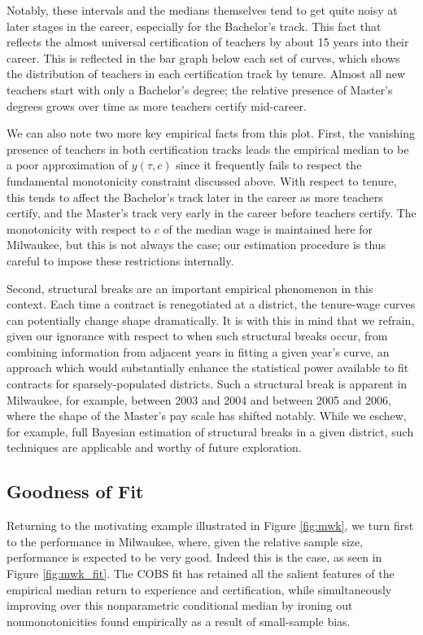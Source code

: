 Notably, these intervals and the medians themselves tend to get quite
noisy at later stages in the career, especially for the Bachelor's
track. This fact that reflects the almost universal certification of
teachers by about 15 years into their career. This is reflected in the
bar graph below each set of curves, which shows the distribution of
teachers in each certification track by tenure. Almost all new teachers
start with only a Bachelor's degree; the relative presence of Master's
degrees grows over time as more teachers certify mid-career.

We can also note two more key empirical facts from this plot. First, the
vanishing presence of teachers in both certification tracks leads the
empirical median to be a poor approximation of \(y(\tau, c)\) since it
frequently fails to respect the fundamental monotonicity constraint
discussed above. With respect to tenure, this tends to affect the
Bachelor's track later in the career as more teachers certify, and the
Master's track very early in the career before teachers certify. The
monotonicity with respect to \(c\) of the median wage is maintained here
for Milwaukee, but this is not always the case; our estimation procedure
is thus careful to impose these restrictions internally.

Second, structural breaks are an important empirical phenomenon in this
context. Each time a contract is renegotiated at a district, the
tenure-wage curves can potentially change shape dramatically. It is with
this in mind that we refrain, given our ignorance with respect to when
such structural breaks occur, from combining information from adjacent
years in fitting a given year's curve, an approach which would
substantially enhance the statistical power available to fit contracts
for sparsely-populated districts. Such a structural break is apparent in
Milwaukee, for example, between 2003 and 2004 and between 2005 and 2006,
where the shape of the Master's pay scale has shifted notably. While we
eschew, for example, full Bayesian estimation of structural breaks in a
given district, such techniques are applicable and worthy of future
exploration.

\subsection{Goodness of Fit}\label{goodness-of-fit}

Returning to the motivating example illustrated in Figure \ref{fig:mwk},
we turn first to the performance in Milwaukee, where, given the relative
sample size, performance is expected to be very good. Indeed this is the
case, as seen in Figure \ref{fig:mwk_fit}. The COBS fit has retained all
the salient features of the empirical median return to experience and
certification, while simultaneously improving over this nonparametric
conditional median by ironing out nonmonotonicities found empirically as
a result of small-sample bias.

